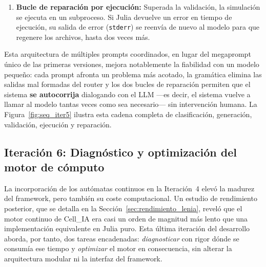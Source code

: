 \begin{enumerate}
    categoría (por ejemplo, que un campo continuo use
    \texttt{state\_type = "Float64"}, o que las densidades de población sumen la
    unidad para que la rejilla quede completamente poblada). Si la validación
    falla, el sistema reinvoca al LLM realimentándolo con el mensaje de error
    concreto para que corrija únicamente eso, repitiendo hasta tres veces.
    \item \textbf{Bucle de reparación por ejecución:} Superada la validación, la
    simulación se ejecuta en un subproceso. Si Julia devuelve un error en tiempo
    de ejecución, su salida de error (\texttt{stderr}) se reenvía de nuevo al
    modelo para que regenere los archivos, hasta dos veces más.
\end{enumerate}

Esta arquitectura de múltiples prompts coordinados, en lugar del megaprompt
único de las primeras versiones, mejora notablemente la fiabilidad con un modelo
pequeño: cada prompt afronta un problema más acotado, la gramática elimina las
salidas mal formadas del router y los dos bucles de reparación permiten que el
sistema \textbf{se autocorrija} dialogando con el LLM —es decir, el sistema
vuelve a llamar al modelo tantas veces como sea necesario— sin intervención
humana. La Figura~\ref{fig:seq_iter5} ilustra esta cadena completa de
clasificación, generación, validación, ejecución y reparación.



\subsection{Iteración 6: Diagnóstico y optimización del motor de cómputo}
\label{sec:iteracion6}
La incorporación de los autómatas continuos en la Iteración~4 elevó la madurez
del framework, pero también su coste computacional. Un estudio de rendimiento
posterior, que se detalla en la Sección~\ref{sec:rendimiento_lenia}, reveló que
el motor continuo de Cell\_IA era casi un orden de magnitud más lento que una
implementación equivalente en Julia puro. Esta última iteración del desarrollo aborda, por tanto, dos
tareas encadenadas: \emph{diagnosticar} con rigor dónde se consumía ese tiempo y
\emph{optimizar} el motor en consecuencia, sin alterar la arquitectura modular
ni la interfaz del framework.

